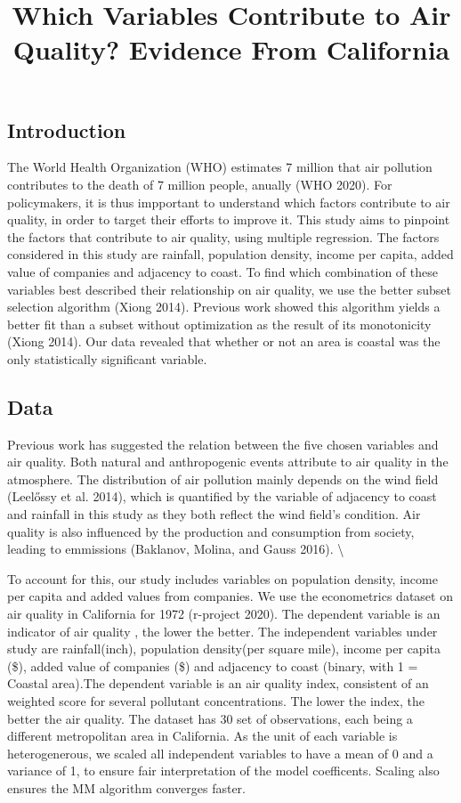 \documentclass[
]{article}
\title{Which Variables Contribute to Air Quality? Evidence From California}
\author{}
\date{\vspace{-2.5em}}
\begin{document}
\maketitle

\hypertarget{introduction}{%
\subsection{Introduction}\label{introduction}}

The World Health Organization (WHO) estimates 7 million that air
pollution contributes to the death of 7 million people, anually (WHO
2020). For policymakers, it is thus impportant to understand which
factors contribute to air quality, in order to target their efforts to
improve it. This study aims to pinpoint the factors that contribute to
air quality, using multiple regression. The factors considered in this
study are rainfall, population density, income per capita, added value
of companies and adjacency to coast. To find which combination of these
variables best described their relationship on air quality, we use the
better subset selection algorithm (Xiong 2014). Previous work showed
this algorithm yields a better fit than a subset without optimization as
the result of its monotonicity (Xiong 2014). Our data revealed that
whether or not an area is coastal was the only statistically significant
variable.

\hypertarget{Data}{%
\subsection{Data}\label{Data}}

Previous work has suggested the relation between the five chosen
variables and air quality. Both natural and anthropogenic events
attribute to air quality in the atmosphere. The distribution of air
pollution mainly depends on the wind field (Leelőssy et al. 2014), which
is quantified by the variable of adjacency to coast and rainfall in this
study as they both reflect the wind field's condition. Air quality is
also influenced by the production and consumption from society, leading
to emmissions (Baklanov, Molina, and Gauss 2016). \textbackslash{}

To account for this, our study includes variables on population density,
income per capita and added values from companies. We use the
econometrics dataset on air quality in California for 1972 (r-project
2020). The dependent variable is an indicator of air quality , the lower
the better. The independent variables under study are rainfall(inch),
population density(per square mile), income per capita (\$), added value
of companies (\$) and adjacency to coast (binary, with 1 = Coastal
area).The dependent variable is an air quality index, consistent of an
weighted score for several pollutant concentrations. The lower the
index, the better the air quality. The dataset has 30 set of
observations, each being a different metropolitan area in California. As
the unit of each variable is heterogenerous, we scaled all independent
variables to have a mean of 0 and a variance of 1, to ensure fair
interpretation of the model coefficents. Scaling also ensures the MM
algorithm converges faster.
\end{document}
